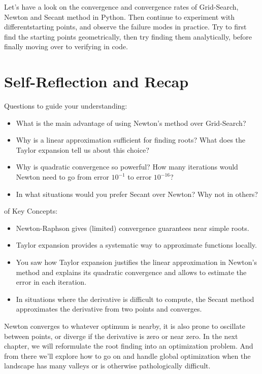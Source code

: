  Let's have a look on the convergence and convergence rates 
of Grid-Search, Newton and Secant method in Python. 
Then continue to experiment with differentstarting points, and observe the 
failure modes in practice. Try to first find the starting points geometrically, 
then try finding them analytically, 
before finally moving over to verifying in code.




\section{Self-Reflection and Recap}

 Questions to guide your understanding:
\begin{itemize}
    \item What is the main advantage of using Newton's method over Grid-Search?
    \item Why is a linear approximation sufficient for finding roots? What does the Taylor expansion tell us about this choice?
    \item Why is quadratic convergence so powerful? How many iterations would Newton need to go from error $10^{-1}$ to error $10^{-16}$?
    \item In what situations would you prefer Secant over Newton? Why not in others?
\end{itemize}

 of Key Concepts:
\begin{itemize}
    \item Newton-Raphson gives (limited) convergence guarantees near simple roots.
    \item Taylor expansion provides a systematic way to approximate functions locally.
    \item You saw how Taylor expansion justifies the linear approximation in Newton's method and explains its quadratic convergence and allows to estimate the error in each iteration.
    \item In situations where the derivative is difficult to compute, the Secant method approximates the derivative from two points and converges.
\end{itemize}



 Newton converges to whatever optimum is nearby, 
it is also prone to oscillate between points, or diverge if the derivative is zero or near zero. In the next chapter, we will reformulate the root finding into an optimization problem.
And from there we'll explore how to go on and handle global optimization when the landscape has many valleys or is otherwise pathologically difficult.



